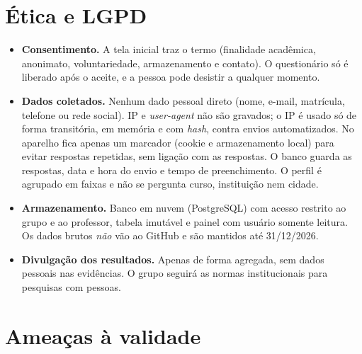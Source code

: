 \documentclass[11pt,a4paper]{article}
\begin{document}
\section{Ética e LGPD}

\begin{itemize}
  \item \textbf{Consentimento.} A tela inicial traz o termo (finalidade acadêmica, anonimato, voluntariedade, armazenamento e contato). O questionário só é liberado após o aceite, e a pessoa pode desistir a qualquer momento.
  \item \textbf{Dados coletados.} Nenhum dado pessoal direto (nome, e-mail, matrícula, telefone ou rede social). IP e \emph{user-agent} não são gravados; o IP é usado só de forma transitória, em memória e com \emph{hash}, contra envios automatizados. No aparelho fica apenas um marcador (cookie e armazenamento local) para evitar respostas repetidas, sem ligação com as respostas. O banco guarda as respostas, data e hora do envio e tempo de preenchimento. O perfil é agrupado em faixas e não se pergunta curso, instituição nem cidade.
  \item \textbf{Armazenamento.} Banco em nuvem (PostgreSQL) com acesso restrito ao grupo e ao professor, tabela imutável e painel com usuário somente leitura. Os dados brutos \emph{não} vão ao GitHub e são mantidos até 31/12/2026.
  \item \textbf{Divulgação dos resultados.} Apenas de forma agregada, sem dados pessoais nas evidências. O grupo seguirá as normas institucionais para pesquisas com pessoas.
\end{itemize}

\section{Ameaças à validade}
\end{document}
